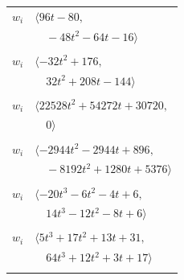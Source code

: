 \documentclass[11pt]{article}
\begin{document}
\begin{longtable}{@{}ll@{}}
$w_i$ & $\langle 96t-80,$\\
 & $\quad -48t^{2}-64t-16\rangle$\\
\addlinespace[2pt]
\multicolumn{2}{@{}p{0.97\textwidth}@{}}{$i=34$, $D_i=16$, $\rho_{ij}$: $3{:}2, \allowbreak 7{:}2, \allowbreak 13{:}1, \allowbreak 18{:}1, \allowbreak 22{:}1, \allowbreak 24{:}1, \allowbreak 29{:}2, \allowbreak 30{:}1, \allowbreak 49{:}1, \allowbreak 65{:}2$}\\
$w_i$ & $\langle -32t^{2}+176,$\\
 & $\quad 32t^{2}+208t-144\rangle$\\
\addlinespace[2pt]
\multicolumn{2}{@{}p{0.97\textwidth}@{}}{$i=35$, $D_i=128$, $\rho_{ij}$: $6{:}2, \allowbreak 7{:}2, \allowbreak 12{:}2, \allowbreak 15{:}2, \allowbreak 18{:}2, \allowbreak 19{:}2, \allowbreak 21{:}2, \allowbreak 28{:}2, \allowbreak 41{:}2, \allowbreak 67{:}2, \allowbreak 72{:}1, \allowbreak 76{:}2$}\\
$w_i$ & $\langle 22528t^{2}+54272t+30720,$\\
 & $\quad 0\rangle$\\
\addlinespace[2pt]
\multicolumn{2}{@{}p{0.97\textwidth}@{}}{$i=36$, $D_i=128$, $\rho_{ij}$: $4{:}2, \allowbreak 5{:}2, \allowbreak 9{:}1, \allowbreak 20{:}1, \allowbreak 22{:}1, \allowbreak 23{:}2, \allowbreak 24{:}2, \allowbreak 27{:}1, \allowbreak 28{:}2, \allowbreak 45{:}1, \allowbreak 48{:}1, \allowbreak 49{:}1, \allowbreak 56{:}1, \allowbreak 60{:}1, \allowbreak 62{:}1, \allowbreak 66{:}2$}\\
$w_i$ & $\langle -2944t^{2}-2944t+896,$\\
 & $\quad -8192t^{2}+1280t+5376\rangle$\\
\addlinespace[2pt]
\multicolumn{2}{@{}p{0.97\textwidth}@{}}{$i=37$, $D_i=4$, $\rho_{ij}$: $9{:}1, \allowbreak 16{:}1, \allowbreak 22{:}2, \allowbreak 30{:}2, \allowbreak 31{:}1, \allowbreak 41{:}1$}\\
$w_i$ & $\langle -20t^{3}-6t^{2}-4t+6,$\\
 & $\quad 14t^{3}-12t^{2}-8t+6\rangle$\\
\addlinespace[2pt]
\multicolumn{2}{@{}p{0.97\textwidth}@{}}{$i=38$, $D_i=16$, $\rho_{ij}$: $11{:}1, \allowbreak 29{:}2, \allowbreak 40{:}2, \allowbreak 46{:}1, \allowbreak 48{:}2, \allowbreak 55{:}1, \allowbreak 59{:}1, \allowbreak 66{:}2$}\\
$w_i$ & $\langle 5t^{3}+17t^{2}+13t+31,$\\
 & $\quad 64t^{3}+12t^{2}+3t+17\rangle$\\
\addlinespace[2pt]

\end{longtable}
\end{document}
